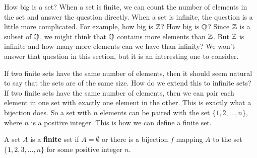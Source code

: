 \begin{comment}

\ActivitySolution We will show that $(g \circ f)^{-1}(C)=f^{-1}(g^{-1}(C))$. Let $x \in (g \circ f)^{-1}(C)$. Then $(g \circ f)(x) \in C$. So $g(f(x)) \in C$ and $f(x) \in g^{-1}(C)$. From this it follows that $x \in f^{-1}(g^{-1}(C))$. So $(g \circ f)^{-1}(C) \subseteq f^{-1}(g^{-1}(C))$. 

Now assume that $x \in f^{-1}(g^{-1}(C))$. Then $f(x) \in g^{-1}(C)$. We then have $g(f(x)) \in C$ or $(g \circ f)(x) \in C$. Thus, $x \in (g \circ f)^{-1}(C)$ and $f^{-1}(g^{-1}(C)) \subseteq (g \circ f)^{-1}(C)$. The two containments demonstrate that $f^{-1}(g^{-1}(C)) = (g \circ f)^{-1}(C)$.

\end{comment}

\label{sec_card_set}

How big is a set? When a set is finite, we can count the number of elements in the set and answer the question directly. When a set is infinite, the question is a little more complicated. For example, how big is $\mathbb{Z}$? How big is $\mathbb{Q}$? Since $\mathbb{Z}$ is a subset of $\mathbb{Q}$, we might think that $\mathbb{Q}$ contains more elements than $\mathbb{Z}$. But $\mathbb{Z}$ is infinite and how many more elements can we have than infinity? We won't answer that question in this section, but it is an interesting one to consider. 

If two finite sets have the same number of elements, then it should seem natural to say that the sets are of the same size. How do we extend this to infinite sets? If two finite sets have the same number of elements, then we can pair each element in one set with exactly one element in the other. This is exactly what a bijection does.  So a set with $n$ elements can be paired with the set $\{1, 2, \ldots, n\}$, where $n$ is a positive integer. This is how we can define a finite set. 

\begin{definition} A set $A$ is a \textbf{finite} set if $A = \emptyset$ or there is a bijection $f$ mapping $A$ to the set $\{1,2,3, \ldots, n\}$ for some positive integer $n$. 
\end{definition}

